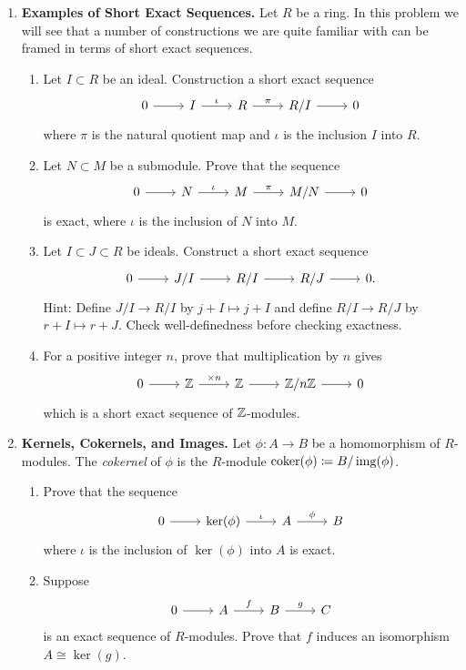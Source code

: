 \documentclass[12pt,reqno]{amsart}
\begin{document}
\begin{enumerate}[leftmargin=*, series=problems]
\item \textbf{Examples of Short Exact Sequences.} Let $R$ be a ring. In this problem we will see that a number of constructions we are quite familiar with can be framed in terms of short exact sequences. 
\begin{enumerate}
  \item Let $I \subset R$ be an ideal. Construction a short exact sequence
     \[
    \begin{tikzcd}
    0 \arrow[r] & I \arrow[r, "\iota"] & R \arrow[r, "\pi"] & R/I \arrow[r] & 0
    \end{tikzcd}
    \]
    where $\pi$ is the natural quotient map and $\iota$ is the inclusion $I$ into $R$. 
    \item Let $N\subset M$ be a submodule. Prove that the sequence
    \[
    \begin{tikzcd}
    0 \arrow[r] & N \arrow[r, "\iota"] & M \arrow[r, "\pi"] & M/N \arrow[r] & 0
    \end{tikzcd}
    \]
    is exact, where $\iota$ is the inclusion of $N$ into $M$. 
    \item Let $I\subset J\subset R$ be ideals. Construct a short exact sequence
    \[
    \begin{tikzcd}
    0 \arrow[r] & J/I \arrow[r] & R/I \arrow[r] & R/J \arrow[r] & 0.
    \end{tikzcd}
    \]
    Hint: Define $J/I\to R/I$ by $j+I\mapsto j+I$ and define $R/I\to R/J$ by $r+I\mapsto r+J$. Check well-definedness before checking exactness.
    \item For a positive integer $n$, prove that multiplication by $n$ gives
    \[
    \begin{tikzcd}
    0 \arrow[r] & \ZZ \arrow[r, "\times n"] & \ZZ \arrow[r] & \ZZ/n\ZZ \arrow[r] & 0
    \end{tikzcd}
    \]
    which is a short exact sequence of $\mathbb{Z}$-modules.
\end{enumerate}

\item \textbf{Kernels, Cokernels, and Images.} Let $\phi:A\to B$ be a homomorphism of $R$-modules. The \emph{cokernel} of $\phi$ is the $R$-module $\operatorname{coker}(\phi)\coloneqq B/\operatorname{img}(\phi)$.

\begin{enumerate}
\item Prove that the sequence
\[
\begin{tikzcd}
0 \arrow[r] & \ker(\phi) \arrow[r, "\iota"] & A \arrow[r, "\phi"] & B 
\end{tikzcd}
\]
where $\iota$ is the inclusion of $\ker(\phi)$ into $A$ is exact.
\item Suppose
\[
\begin{tikzcd}
0 \arrow[r] & A \arrow[r, "f"] & B \arrow[r, "g"] & C
\end{tikzcd}
\]
is an exact sequence of $R$-modules.  Prove that $f$ induces an isomorphism $A\cong \ker(g)$.


\end{enumerate}
\end{enumerate}
\end{document}

